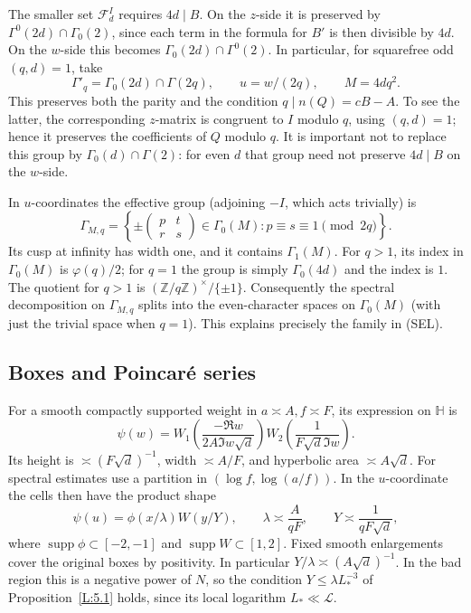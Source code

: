 \documentclass[10pt,reqno]{amsart}
\theoremstyle{definition}
\numberwithin{equation}{section}
\newcommand{\Z}{\mathbb Z}
\newcommand{\HH}{\mathbb H}
\newcommand{\cL}{\mathcal L}
\newcommand{\cF}{\mathcal F}
\begin{document}
The smaller set $\cF_d^I$ requires $4d\mid B$. On the $z$-side it is
preserved by $\Gamma^0(2d)\cap\Gamma_0(2)$, since each term in the
formula for $B'$ is then divisible by $4d$. On the $w$-side this becomes
$\Gamma_0(2d)\cap\Gamma^0(2)$.
In particular, for squarefree odd $(q,d)=1$, take
\begin{equation}\label{A:eq:sievegroup}
 \Gamma'_q=\Gamma_0(2d)\cap\Gamma(2q),\qquad u=w/(2q),\qquad M=4dq^2.
\end{equation}
This preserves both the parity and the condition
$q\mid n(Q)=cB-A$. To see the latter, the corresponding $z$-matrix is
congruent to $I$ modulo $q$, using $(q,d)=1$; hence it preserves the
coefficients of $Q$ modulo $q$. It is important not to replace this group
by $\Gamma_0(d)\cap\Gamma(2)$: for even $d$ that group need not preserve
$4d\mid B$ on the $w$-side.

In $u$-coordinates the effective group (adjoining $-I$, which acts trivially)
is
\[
 \Gamma_{M,q}=
 \left\{\pm\begin{pmatrix}p&t\\r&s\end{pmatrix}\in\Gamma_0(M):
                                     p\equiv s\equiv1\pmod{2q}\right\}.
\]
Its cusp at infinity has width one, and it contains $\Gamma_1(M)$.
For $q>1$, its index in $\Gamma_0(M)$ is $\varphi(q)/2$; for $q=1$
the group is simply $\Gamma_0(4d)$ and the index is $1$.
The quotient for $q>1$ is $(\Z/q\Z)^\times/\{\pm1\}$.
Consequently the spectral decomposition on $\Gamma_{M,q}$ splits into
the even-character spaces on $\Gamma_0(M)$ (with just the trivial space
when $q=1$). This explains precisely the family in (SEL).

\subsection{Boxes and Poincar\'e series}
For a smooth compactly supported weight in $a\asymp A,f\asymp F$, its
expression on $\HH$ is
\[
 \psi(w)=W_1\!\left(\frac{-\Re w}{2A\Im w\sqrt d}\right)
          W_2\!\left(\frac1{F\sqrt d\Im w}\right).
\]
Its height is $\asymp(F\sqrt d)^{-1}$, width $\asymp A/F$, and
hyperbolic area $\asymp A\sqrt d$. For spectral estimates use a partition in
$(\log f,\log(a/f))$. In the $u$-coordinate the cells then have the
product shape
\begin{equation}\label{A:eq:box}
 \psi(u)=\phi(x/\lambda)W(y/Y),\qquad
 \lambda\asymp\frac A{qF},\qquad Y\asymp\frac1{qF\sqrt d},
\end{equation}
where $\operatorname{supp}\phi\subset[-2,-1]$ and
$\operatorname{supp}W\subset[1,2]$.
Fixed smooth enlargements cover the original boxes by positivity. In
particular $Y/\lambda\asymp(A\sqrt d)^{-1}$. In the bad region this
is a negative power of $N$, so the condition $Y\le\lambda L_*^{-3}$
of Proposition~\ref{L:5.1} holds, since its local logarithm $L_*\ll\cL$.
\end{document}
